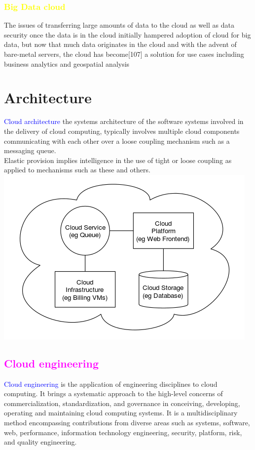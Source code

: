 \documentclass[11pt]{article}
\begin{document}
\subsubsection{\textcolor{yellow}{Big Data cloud}}
The issues of transferring large amounts of data to the cloud as well as data security once the data is in the cloud initially hampered adoption of cloud for big data, but now that much data originates in the cloud and with the advent of bare-metal servers, the cloud has become[107] a solution for use cases including business analytics and geospatial analysis
\section{\color{green}Architecture}
\textcolor{blue}{Cloud architecture} the systems architecture of the software systems involved in the delivery of cloud computing, typically involves multiple cloud components communicating with each other over a loose coupling mechanism such as a messaging queue.\\ Elastic provision implies intelligence in the use of tight or loose coupling as applied to mechanisms such as these and others.\\
\includegraphics[scale=.4]{a3.png}
\subsection{\textcolor{magenta}{Cloud engineering}}
\textcolor{blue}{Cloud engineering} is the application of engineering disciplines to cloud computing. It brings a systematic approach to the high-level concerns of commercialization, standardization, and governance in conceiving, developing, operating and maintaining cloud computing systems. It is a multidisciplinary method encompassing contributions from diverse areas such as systems, software, web, performance, information technology engineering, security, platform, risk, and quality engineering.
\end{document}
